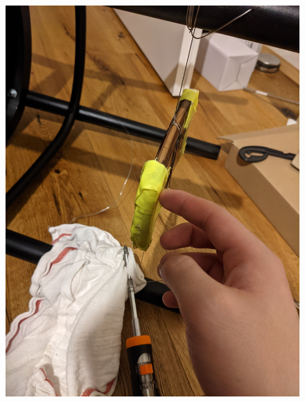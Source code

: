 \documentclass[11pt,ngerman]{scrartcl}
\begin{document}
\begin{figure}[H]
    \centering
    \begin{minipage}[htbp]{\linewidth}
        \begin{minipage}[htbp]{.32\linewidth} %
            \includegraphics[angle=-90,origin=c,width=\linewidth]{pics/Aufbau (1).jpg}
        \end{minipage}
        \begin{minipage}[htbp]{.32\linewidth} %

\end{minipage}
\end{minipage}
\end{figure}
\end{document}

